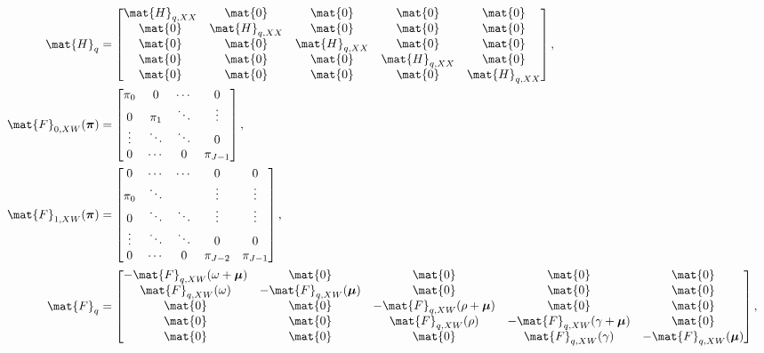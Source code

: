 \documentclass{jpmarticle}
\renewcommand{\vec}[1]{\boldsymbol{\mathrm{#1}}}
\let\subequationsorig\subequations%
\let\endsubequationsorig\endsubequations%
\renewenvironment{subequations}{
  \subequationsorig
  \renewcommand{\theequation}{\theparentequation.\arabic{equation}}
}{
  \endsubequationsorig
}
\begin{document}
\begin{subequations}
\begin{align}
    \\
    \mat{H}_{q} &=
    \begin{bmatrix}
      \mat{H}_{q, XX} & \mat{0} & \mat{0} & \mat{0} & \mat{0} \\
      \mat{0} & \mat{H}_{q, XX} & \mat{0} & \mat{0} & \mat{0} \\
      \mat{0} & \mat{0} & \mat{H}_{q, XX} & \mat{0} & \mat{0} \\
      \mat{0} & \mat{0} & \mat{0} & \mat{H}_{q, XX} & \mat{0}
      \\
      \mat{0} & \mat{0} & \mat{0} & \mat{0} & \mat{H}_{q, XX}
    \end{bmatrix},
    \\
    \mat{F}_{0, XW}(\vec{\pi}) &=
    \begin{bmatrix}
      \pi_0 & 0 & \cdots & 0 \\
      0 & \pi_1 & \ddots & \vdots \\
      \vdots & \ddots & \ddots & 0 \\
      0 & \cdots & 0 & \pi_{J - 1}
    \end{bmatrix},
    \\
    \mat{F}_{1, XW}(\vec{\pi}) &=
    \begin{bmatrix}
      0 & \cdots & \cdots & 0 & 0 \\
      \pi_0 & \ddots & & \vdots & \vdots \\
      0 & \ddots & \ddots & \vdots & \vdots \\
      \vdots & \ddots & \ddots & 0 & 0 \\
      0 & \cdots & 0 & \pi_{J - 2} & \pi_{J - 1}
    \end{bmatrix},
    \\
    \mat{F}_q &=
    \begin{bmatrix}
      - \mat{F}_{q, XW}(\omega + \vec{\mu}) & \mat{0} & \mat{0} & \mat{0}
      & \mat{0}
      \\
      \mat{F}_{q, XW}(\omega) & - \mat{F}_{q, XW}(\vec{\mu})
      & \mat{0} & \mat{0} & \mat{0}
      \\
      \mat{0} & \mat{0} & - \mat{F}_{q, XW}(\rho + \vec{\mu}) & \mat{0}
      & \mat{0}
      \\
      \mat{0} & \mat{0} & \mat{F}_{q, XW}(\rho)
      & - \mat{F}_{q, XW}(\gamma + \vec{\mu}) & \mat{0}
      \\
      \mat{0} & \mat{0} & \mat{0} & \mat{F}_{q, XW}(\gamma)
      & - \mat{F}_{q, XW}(\vec{\mu})
    \end{bmatrix},
    \\

\end{align}
\end{subequations}
\end{document}
